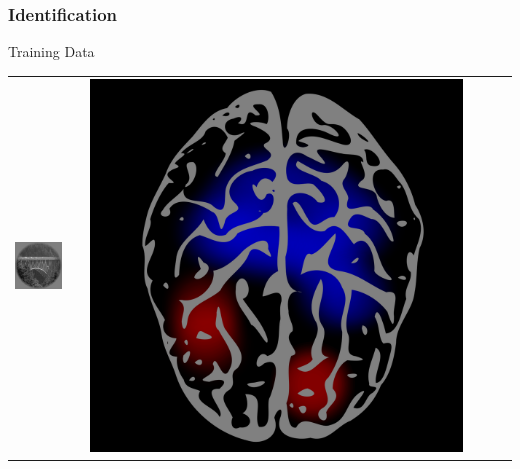 \documentclass{beamer}
\begin{document}
\begin{frame}
\frametitle{Identification}
\begin{center}
Training Data
\\
\begin{tabular}{ccc||ccc}
\hline
\includegraphics[scale = .26]{img1.png} & \hspace{0.2in} & \includegraphics[scale = 0.035]{brain1.png} &

\end{tabular}
\end{center}
\end{frame}
\end{document}
